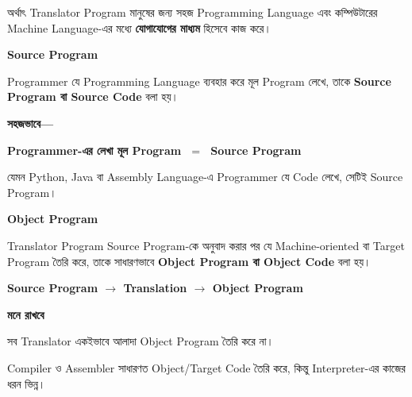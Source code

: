 অর্থাৎ Translator Program মানুষের জন্য সহজ Programming Language
এবং কম্পিউটারের Machine Language-এর মধ্যে
\textbf{যোগাযোগের মাধ্যম} হিসেবে কাজ করে।


\begin{definitionbox}

\textbf{\color{darkTeal}Source Program}

Programmer যে Programming Language ব্যবহার করে মূল Program
লেখে, তাকে \textbf{Source Program বা Source Code} বলা হয়।

\end{definitionbox}

\textbf{সহজভাবে—}

\begin{center}

\textbf{
Programmer-এর লেখা মূল Program
\(\;=\;\)
Source Program
}

\end{center}

যেমন Python, Java বা Assembly Language-এ Programmer যে Code
লেখে, সেটিই Source Program।


\begin{definitionbox}

\textbf{\color{darkTeal}Object Program}

Translator Program Source Program-কে অনুবাদ করার পর যে
Machine-oriented বা Target Program তৈরি করে, তাকে সাধারণভাবে
\textbf{Object Program বা Object Code} বলা হয়।

\end{definitionbox}

\begin{center}

\textbf{
Source Program
\(\longrightarrow\)
Translation
\(\longrightarrow\)
Object Program
}

\end{center}

\begin{rememberbox}

\textbf{\color{deepOrange}মনে রাখবে}

সব Translator একইভাবে আলাদা Object Program তৈরি করে না।

Compiler ও Assembler সাধারণত Object/Target Code তৈরি করে,
কিন্তু Interpreter-এর কাজের ধরন ভিন্ন।

\end{rememberbox}

